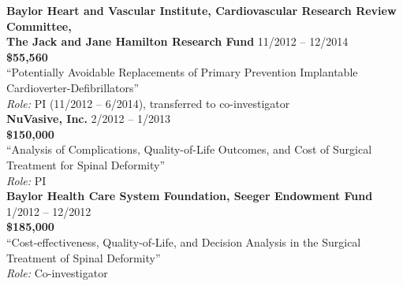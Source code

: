 \documentclass[9pt]{article}
\newenvironment{changemargin}[2]{%
  \begin{list}{}{%
    \setlength{\topsep}{0pt}%
    \setlength{\leftmargin}{#1}%
    \setlength{\rightmargin}{#2}%
    \setlength{\listparindent}{\parindent}%
    \setlength{\itemindent}{\parindent}%
    \setlength{\parsep}{\parskip}%
  }%
  \item[]}{\end{list}
}
\newenvironment{body} {
	\vspace*{-16pt}
	\begin{changemargin}{-0.25in}{-0.5in}
  }	
	{\end{changemargin}
}
\begin{document}
\begin{body}
\medskip
 \textbf{Baylor Heart and Vascular Institute, Cardiovascular Research Review Committee, \\ The Jack and Jane Hamilton Research Fund} \hfill 11/2012 -- 12/2014 \\
 \textbf{\$55,560} \\
 ``Potentially Avoidable Replacements of Primary Prevention Implantable Cardioverter-Defibrillators'' \\
 \textit{Role:} PI (11/2012 -- 6/2014), transferred to co-investigator \\

\medskip
 \textbf{NuVasive, Inc.} \hfill 2/2012 -- 1/2013 \\
 \textbf{\$150,000} \\
 ``Analysis of Complications, Quality-of-Life Outcomes, and Cost of Surgical Treatment for Spinal Deformity'' \\
 \textit{Role:} PI \\

\medskip
 \textbf{Baylor Health Care System Foundation, Seeger Endowment Fund} \hfill 1/2012 -- 12/2012 \\
 \textbf{\$185,000} \\
 ``Cost-effectiveness, Quality-of-Life, and Decision Analysis in the Surgical Treatment of Spinal Deformity'' \\
 \textit{Role:} Co-investigator \\

\end{body}
\smallskip
\end{document}
